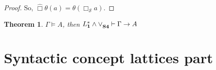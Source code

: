 \documentclass[a4paper]{article}
\theoremstyle{defin}
\theoremstyle{theorem}
\newtheorem{theorem}{Theorem}
\theoremstyle{prop}
\theoremstyle{lemma}
\theoremstyle{ex}
\theoremstyle{col}
\begin{document}
\begin{proof}
So, $\hat{\Box} \theta(a) = \theta(\Box_{\mathcal{S}} a)$.

\end{proof}

\begin{theorem}
  $\Gamma \models A$, then ${L^{*}_{\bf 1} \land \lor}_{\bf S4} \vdash \Gamma \rightarrow A$
\end{theorem}

\section{Syntactic concept lattices part}
\end{document}
